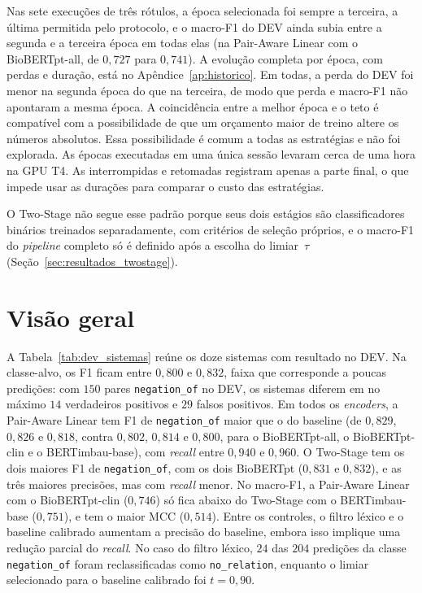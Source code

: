 Nas sete execuções de três rótulos, a época selecionada foi sempre a terceira, a
última permitida pelo protocolo, e o macro-F1 do DEV ainda subia entre a segunda e a
terceira época em todas elas (na Pair-Aware Linear com o BioBERTpt-all, de $0{,}727$
para $0{,}741$). A evolução completa por época, com perdas e duração, está no
Apêndice~\ref{ap:historico}. Em todas, a perda do DEV foi menor na segunda época do
que na terceira, de modo que perda e macro-F1 não apontaram a mesma época. A
coincidência entre a melhor época e o teto é compatível com a possibilidade de que um
orçamento maior de treino altere os números absolutos. Essa possibilidade é comum a
todas as estratégias e não foi explorada. As épocas executadas em uma única sessão
levaram cerca de uma hora na GPU T4. As interrompidas e retomadas registram apenas a
parte final, o que impede usar as durações para comparar o custo das estratégias.

O Two-Stage não segue esse padrão porque seus dois estágios são classificadores
binários treinados separadamente, com critérios de seleção próprios, e o macro-F1 do
\emph{pipeline} completo só é definido após a escolha do limiar~$\tau$
(Seção~\ref{sec:resultados_twostage}).

\section{Visão geral}
\label{sec:resultados}

A Tabela~\ref{tab:dev_sistemas} reúne os doze sistemas com resultado no DEV. Na
classe-alvo, os F1 ficam entre $0{,}800$ e $0{,}832$, faixa que corresponde a poucas
predições: com $150$ pares \texttt{negation\_of} no DEV, os sistemas diferem em no
máximo $14$ verdadeiros positivos e $29$ falsos positivos. Em todos os
\emph{encoders}, a Pair-Aware Linear tem F1 de \texttt{negation\_of} maior que o do
baseline (de $0{,}829$, $0{,}826$ e $0{,}818$, contra $0{,}802$, $0{,}814$ e $0{,}800$,
para o BioBERTpt-all, o BioBERTpt-clin e o BERTimbau-base), com \emph{recall} entre
$0{,}940$ e $0{,}960$. O Two-Stage tem os dois maiores F1 de \texttt{negation\_of}, com
os dois BioBERTpt ($0{,}831$ e $0{,}832$), e as três maiores precisões, mas com
\emph{recall} menor. No macro-F1, a Pair-Aware Linear com o BioBERTpt-clin
($0{,}746$) só fica abaixo do Two-Stage com o BERTimbau-base ($0{,}751$), e tem o
maior MCC ($0{,}514$). Entre os controles, o filtro léxico e o baseline calibrado aumentam a precisão do baseline, embora isso implique uma redução parcial do \emph{recall}. No caso do filtro léxico, $24$ das $204$ predições da classe \texttt{negation\_of} foram reclassificadas como \texttt{no\_relation}, enquanto o limiar selecionado para o baseline calibrado foi $t=0{,}90$.

